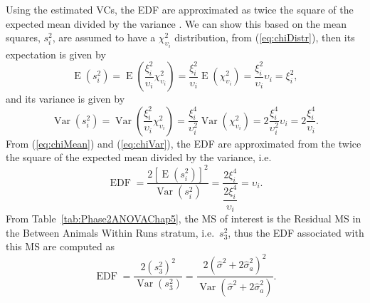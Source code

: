 Using the estimated VCs, the EDF are approximated as twice the square of the expected mean divided by the variance \citep{Satterthwaite1941}. We can show this based on the mean squares, $s_i^2$, are assumed to have a $\chi_{\upsilon_i}^2$ distribution, from (\ref{eq:chiDistr}), then its expectation is given by
\begin{equation}\label{eq:chiMean}
\operatorname{E}(s_i^2) = \operatorname{E}\left(\dfrac{\xi_i^2}{\upsilon_i}\chi_{\upsilon_i}^2\right) = \dfrac{\xi_i^2}{\upsilon_i} \operatorname{E}(\chi_{\upsilon_i}^2) = \dfrac{\xi_i^2}{\upsilon_i} \upsilon_i = \xi_i^2, 
\end{equation}
and its variance is given by 
\begin{equation}\label{eq:chiVar}
\operatorname{Var}(s_i^2) = \operatorname{Var}\left(\dfrac{\xi_i^2}{\upsilon_i}\chi_{\upsilon_i}^2\right) = \dfrac{\xi_i^4}{\upsilon_i^2} \operatorname{Var}( \chi_{\upsilon_i}^2) = 2 \dfrac{\xi_i^4}{\upsilon_i^2}  \upsilon_i = 2 \dfrac{\xi_i^4}{\upsilon_i}. 
\end{equation}
From (\ref{eq:chiMean}) and (\ref{eq:chiVar}), the EDF are approximated from the twice the square of the expected mean divided by the variance, i.e.\
\[
\operatorname{EDF} = \dfrac{2[\operatorname{E}(s_i^2)]^2}{\operatorname{Var}(s_i^2)} =  \frac{2\xi_i^4}{\dfrac{2\xi_i^4}{\upsilon_i}} =  \upsilon_i.
\]
From Table~\ref{tab:Phase2ANOVAChap5}, the MS of interest is the Residual MS in the Between Animals Within Runs stratum, i.e.\ $s_3^2$, thus the EDF associated with this MS are computed as 
\begin{equation}\label{eq:edf1}
\operatorname{EDF} = \frac{2(s_3^2)^2}{\operatorname{Var}(s_3^2)} = \frac{2(\hat{\sigma}^2 + 2\hat{\sigma}_a^2)^2}{\operatorname{Var}(\hat{\sigma}^2 + 2\hat{\sigma}_a^2)}.
\end{equation}
  
